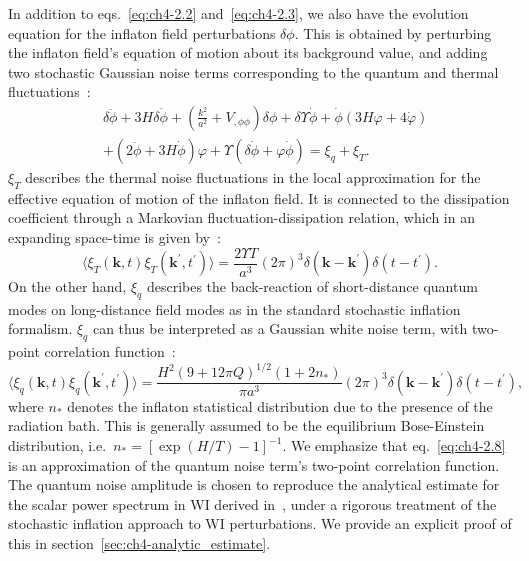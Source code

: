 In addition to eqs.~\eqref{eq:ch4-2.2} and~\eqref{eq:ch4-2.3}, we also have the evolution equation for the inflaton field perturbations $\delta\phi$. This is obtained by perturbing the inflaton field's equation of motion about its background value, and adding two stochastic Gaussian noise terms corresponding to the quantum and thermal fluctuations~\cite{Ramos:2013nsa}:
\begin{align}
& \delta \ddot{\phi}+3 H \delta \dot{\phi}+\left(\frac{k^2}{a^2}+V_{, \phi \phi}\right) \delta \phi+\delta \Upsilon \dot{\phi} +\dot{\phi}(3H\varphi+4\dot{\varphi}) \nonumber\\
&+(2 \ddot{\phi}+3 H \dot{\phi}) \varphi+\Upsilon(\delta \dot{\phi}+\varphi\dot{\phi})=\xi_q+\xi_T. \label{eq:ch4-2.6}
\end{align}
$\xi_T$ describes the thermal noise fluctuations in the local approximation for the effective equation of motion of the inflaton field. It is connected to the dissipation coefficient through a Markovian fluctuation-dissipation
relation, which in an expanding space-time is
given by~\cite{Ramos:2013nsa}:
\begin{equation}
    \langle \xi_{T}(\mathbf{k},t)\xi_{T}(\mathbf{k^\prime},t^\prime)\rangle=\frac{2\Upsilon T}{a^3} (2\pi)^3 \delta(\mathbf{k}-\mathbf{k}^\prime) \delta(t-t^\prime). \label{eq:ch4-2.7}
\end{equation}
On the other hand, $\xi_q$ describes the back-reaction of short-distance quantum modes on long-distance field modes as in the standard stochastic inflation formalism. $\xi_q$ can thus be interpreted as a Gaussian white noise term, with two-point correlation function~\cite{Kamali:2023lzq}:
\begin{equation}
    \langle \xi_{q}(\mathbf{k},t)\xi_{q}(\mathbf{k^\prime},t^\prime)\rangle=\frac{H^2 (9+12\pi Q)^{1/2}(1+2n_{*})}{\pi a^3} (2\pi)^3 \delta(\mathbf{k}-\mathbf{k}^\prime) \delta(t-t^\prime),  \label{eq:ch4-2.8}
\end{equation}
where $n_*$ denotes the inflaton statistical distribution due to the presence of the radiation bath. This is generally assumed to be the equilibrium Bose-Einstein distribution, i.e.\ $n_* = [\exp(H/T) - 1]^{-1}$. We emphasize that eq.~\eqref{eq:ch4-2.8} is an approximation of the quantum noise term's two-point correlation function. The quantum noise amplitude is chosen to reproduce the analytical estimate for the scalar power spectrum in WI derived in~\cite{Ramos:2013nsa}, under a rigorous treatment of the stochastic inflation approach to WI perturbations. We provide an explicit proof of this in section~\ref{sec:ch4-analytic_estimate}.

